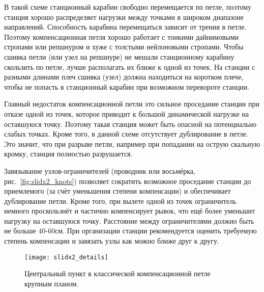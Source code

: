 \documentclass[fleqn, 12pt]{extarticle}
\begin{document}
    В такой схеме станционный карабин свободно перемещается по петле, поэтому станция хорошо распределяет
    нагрузки между точками в широком диапазоне направлений.
    Способность карабина перемещаться зависит от трения в петле. Поэтому компенсационная петля хорошо работает с тонкими дайнимовыми стропами или репшнуром и хуже
    с толстыми нейлоновыми стропами. Чтобы сшивка петли (или узел на репшнуре) не мешали станционному карабину скользить по петле, лучше располагать их ближе к одной из точек.
    На станции с разными длинами плеч сшивка (узел) должна находиться на коротком плече, чтобы не попасть в станционный карабин при возможном перевороте станции.
    
	Главный недостаток компенсационной петли это сильное проседание станции при отказе одной из точек, которое приводит к большой динамической нагрузке на оставшуюся точку.
    Поэтому такая станция может быть опасной на потенциально слабых точках. Кроме того, в данной схеме отсутствует дублирование в петле. Это значит, что при разрыве петли, например
    при попадании на острую скальную кромку, станция полностью разрушается.
    
    Завязывание узлов-ограничителей (проводник или восьмёрка, рис.~\ref{fig:slidx2_knots}) позволяет сократить возможное проседание станции до приемлемого (за счёт уменьшения степени компенсации)
    и обеспечивает дублирование петли. Кроме того, при вылете одной из точек ограничитель немного проскользнёт
    и частично компенсирует рывок, что ещё более уменьшит нагрузку на оставшуюся точку.
    Расстояние между ограничителями должно быть не больше 40-60см. При организации станции рекомендуется оценить требуемую степень компенсации и завязать узлы как можно ближе друг к другу. 
    
    \begin{figure}
        \centering
        \texttt{[image: slidx2\_details]}
        \caption{Центральный пункт в классической компенсационной петле крупным планом.}\label{fig:slidx2_details}
    \end{figure}
    
\end{document}
